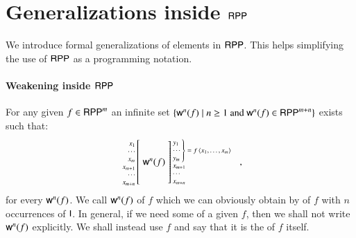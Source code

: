 \section{Generalizations inside $ \mathsf{RPP} $}
\label{section:Generalizations inside RPP}

We introduce formal generalizations of elements in $\mathsf{RPP}$. This helps simplifying the 
use of $ \mathsf{RPP} $ as a programming notation.

\paragraph{Weakening inside $ \mathsf{RPP} $}
For any given $ f\in\mathsf{RPP}^m $ an infinite set 
$ \{\mathsf{w}^n(f) \mid n\geq 1 \text{ and } \mathsf{w}^n(f) \in \mathsf{RPP}^{m+n}\}$ 
exists such that:
\begin{align*}
\arraycolsep=1.4pt
\begin{array}{rcl}
 \left. {\scriptsize 
           \begin{array}{r}
            \\[-2mm]
             x_1\\ \cdots\\ x_m
            \\
             x_{m+1}\\ \cdots\\ x_{m+n}
           \end{array} 
         } \right[
 & \rprWea^n(f) &
 \left] {\scriptsize 
          \begin{array}{l}
           \!\!
           \left .
           \begin{array}{l}
            y_1\\ \cdots\\ y_m
           \end{array} 
           \right \} = 
               f\,\la x_1, \ldots, x_m \ra
             \\
             x_{m+1}\\ \cdots\\ x_{m+n}
          \end{array} 
        } \right.
\end{array}
\enspace ,
\end{align*}
for every $ \mathsf{w}^n(f)$. We call $ \mathsf{w}^n(f) $ \rprWeaName of $ f $ which we can obviously obtain by \rprPComName
of $ f $ with $ n $ occurrences of $ \mathsf{I} $. In general, if we need some \rprWeaName of a given 
$ f $, then we shall not write $ \mathsf{w}^n(f) $ explicitly. We shall instead use $ f $ and say that
it is the \rprWeaName of $ f $ itself.


